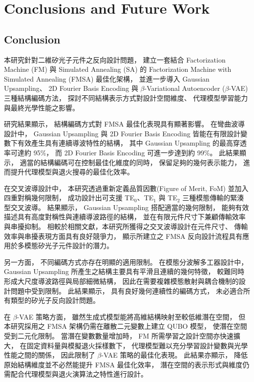 \chapter{Conclusions and Future Work}
\label{ch:conclusion_futurework}

\section{Conclusion}
\label{ch:conclusion}

本研究針對二維矽光子元件之反向設計問題，
建立一套結合 Factorization Machine (FM) 與 Simulated Annealing (SA) 的
Factorization Machine with Simulated Annealing (FMSA) 最佳化架構，
並進一步導入 Gaussian Upsampling、
2D Fourier Basis Encoding 與
$\beta$-Variational Autoencoder ($\beta$-VAE)
三種結構編碼方法，
探討不同結構表示方式對設計空間維度、
代理模型學習能力與最終光學性能之影響。

研究結果顯示，
結構編碼方式對 FMSA 最佳化表現具有顯著影響。
在彎曲波導設計中，
Gaussian Upsampling 與 2D Fourier Basis Encoding
皆能在有限設計變數下有效產生具有連續導波特性的結構，
其中 Gaussian Upsampling 的最高穿透率可達約 95\%，
而 2D Fourier Basis Encoding 可進一步達到約 99\%。
此結果顯示，
適當的結構編碼可在控制最佳化維度的同時，
保留足夠的幾何表示能力，
進而提升代理模型與退火搜尋的最佳化效率。

在交叉波導設計中，
本研究透過重新定義品質因數(Figure of Merit, FoM)
並加入四重對稱幾何限制，
成功設計出可支援 TE$_0$、TE$_1$ 與 TE$_2$
三種模態傳輸的緊湊型交叉波導。
結果顯示，
Gaussian Upsampling 搭配適當的幾何限制，
能夠有效描述具有高度對稱性與連續導波路徑的結構，
並在有限元件尺寸下兼顧傳輸效率與串擾抑制。
相較於相關文獻，本研究所獲得之交叉波導設計在元件尺寸、
傳輸效率與串擾表現方面具有良好競爭力，
顯示所建立之 FMSA 反向設計流程具有應用於多模態矽光子元件設計的潛力。

另一方面，
不同編碼方式亦存在明顯的適用限制。
在模態分波解多工器設計中，
Gaussian Upsampling 所產生之結構主要具有平滑且連續的幾何特徵，
較難同時形成大尺度導波路徑與局部細微結構，
因此在需要複雜模態散射與耦合機制的設計問題中受到限制。
此結果顯示，
具有良好幾何連續性的編碼方式，
未必適合所有類型的矽光子反向設計問題。

在 $\beta$-VAE 策略方面，
雖然生成式模型能將高維結構映射至較低維潛在空間，
但本研究採用之 FMSA 架構仍需在離散二元變數上建立 QUBO 模型，
使潛在空間受到二元化限制。
當潛在變數數量增加時，
FM 所需學習之設計空間亦快速擴大，
在固定資料量與模擬退火採樣數下，
代理模型難以充分學習設計變數與光學性能之間的關係，
因此限制了 $\beta$-VAE 策略的最佳化表現。
此結果亦顯示，
降低原始結構維度並不必然能提升 FMSA 最佳化效率，
潛在空間的表示形式與維度仍需配合代理模型與退火演算法之特性進行設計。

